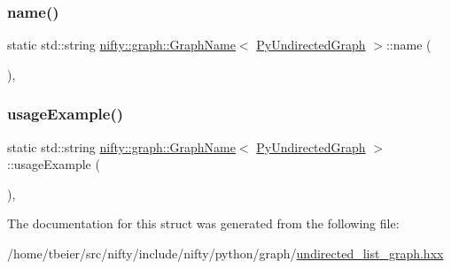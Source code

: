 \mbox{\label{structnifty_1_1graph_1_1GraphName_3_01PyUndirectedGraph_01_4_a36e0e5cf6d601ab8e63d65180dc4162a}} 
\subsubsection{\texorpdfstring{name()}{name()}}
{\footnotesize\ttfamily static std\+::string \hyperlink{structnifty_1_1graph_1_1GraphName}{nifty\+::graph\+::\+Graph\+Name}$<$ \hyperlink{namespacenifty_1_1graph_a62ff5304d118f627910196adc6ab7aab}{Py\+Undirected\+Graph} $>$\+::name (\begin{DoxyParamCaption}{ }\end{DoxyParamCaption})\hspace{0.3cm}{\ttfamily [inline]}, {\ttfamily [static]}}

\mbox{\label{structnifty_1_1graph_1_1GraphName_3_01PyUndirectedGraph_01_4_aec70e4ad4be73906f4b2fd6723c33a1d}} 
\subsubsection{\texorpdfstring{usage\+Example()}{usageExample()}}
{\footnotesize\ttfamily static std\+::string \hyperlink{structnifty_1_1graph_1_1GraphName}{nifty\+::graph\+::\+Graph\+Name}$<$ \hyperlink{namespacenifty_1_1graph_a62ff5304d118f627910196adc6ab7aab}{Py\+Undirected\+Graph} $>$\+::usage\+Example (\begin{DoxyParamCaption}{ }\end{DoxyParamCaption})\hspace{0.3cm}{\ttfamily [inline]}, {\ttfamily [static]}}



The documentation for this struct was generated from the following file\+:\begin{DoxyCompactItemize}
\item 
/home/tbeier/src/nifty/include/nifty/python/graph/\hyperlink{python_2graph_2undirected__list__graph_8hxx}{undirected\+\_\+list\+\_\+graph.\+hxx}\end{DoxyCompactItemize}
